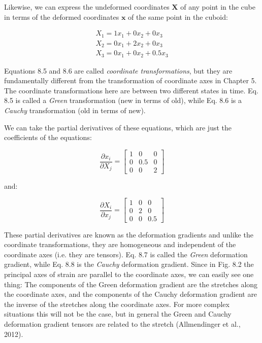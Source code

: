 \documentclass[a4paper , 12pt]{book}
\begin{document}
Likewise, we can express the undeformed coordinates $\mathbf{X}$ of any point in the cube in terms of the deformed coordinates $\mathbf{x}$ of the same point in the cuboid:

\begin{equation}
    \begin{gathered}
        X_1 = 1 x_1 + 0 x_2 + 0 x_3 \\
        X_2 = 0 x_1 + 2 x_2 + 0 x_3 \\
        X_3 = 0 x_1 + 0 x_2 + 0.5 x_3
    \end{gathered}
\end{equation}

Equations 8.5 and 8.6 are called \textit{coordinate transformations}, but they are fundamentally different from the transformation of coordinate axes in Chapter 5. The coordinate transformations here are between two different states in time. Eq. 8.5 is called a \textit{Green} transformation (new in terms of old), while Eq. 8.6 is a \textit{Cauchy} transformation (old in terms of new).

We can take the partial derivatives of these equations, which are just the coefficients of the equations:

\begin{equation}
    \frac{\partial x_i}{\partial X_j}=\begin{bmatrix}1&0&0\\0&0.5&0\\0&0&2\end{bmatrix}
\end{equation}

and:

\begin{equation}
    \frac{\partial X_i}{\partial x_j}=\begin{bmatrix}1&0&0\\0&2&0\\0&0&0.5\end{bmatrix}
\end{equation}

These partial derivatives are known as the deformation gradients and unlike the coordinate transformations, they are homogeneous and independent of the coordinate axes (i.e. they are tensors). Eq. 8.7 is called the \textit{Green} deformation gradient, while Eq. 8.8 is the \textit{Cauchy} deformation gradient. Since in Fig. 8.2 the principal axes of strain are parallel to the coordinate axes, we can easily see one thing: The components of the Green deformation gradient are the stretches along the coordinate axes, and the components of the Cauchy deformation gradient are the inverse of the stretches along the coordinate axes. For more complex situations this will not be the case, but in general the Green and Cauchy deformation gradient tensors are related to the stretch (Allmendinger et al., 2012).
\end{document}
